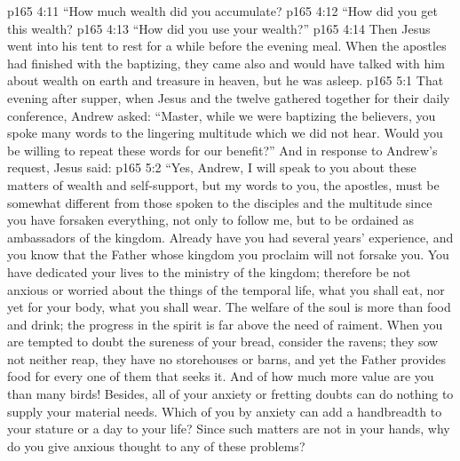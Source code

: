 \vs p165 4:11 \textcolor{ubdarkred}{“\bibnobreakspace How much wealth did you accumulate?}
\vs p165 4:12 \textcolor{ubdarkred}{“\bibnobreakspace How did you get this wealth?}
\vs p165 4:13 \textcolor{ubdarkred}{“\bibnobreakspace How did you use your wealth?”}
\vs p165 4:14 \pc Then Jesus went into his tent to rest for a while before the evening meal. When the apostles had finished with the baptizing, they came also and would have talked with him about wealth on earth and treasure in heaven, but he was asleep.
\vs p165 5:1 That evening after supper, when Jesus and the twelve gathered together for their daily conference, Andrew asked: “Master, while we were baptizing the believers, you spoke many words to the lingering multitude which we did not hear. Would you be willing to repeat these words for our benefit?” And in response to Andrew’s request, Jesus said:
\vs p165 5:2 \pc \textcolor{ubdarkred}{“Yes, Andrew, I will speak to you about these matters of wealth and self\hyp{}support, but my words to you, the apostles, must be somewhat different from those spoken to the disciples and the multitude since you have forsaken everything, not only to follow me, but to be ordained as ambassadors of the kingdom. Already have you had several years’ experience, and you know that the Father whose kingdom you proclaim will not forsake you. You have dedicated your lives to the ministry of the kingdom; therefore be not anxious or worried about the things of the temporal life, what you shall eat, nor yet for your body, what you shall wear. The welfare of the soul is more than food and drink; the progress in the spirit is far above the need of raiment. When you are tempted to doubt the sureness of your bread, consider the ravens; they sow not neither reap, they have no storehouses or barns, and yet the Father provides food for every one of them that seeks it. And of how much more value are you than many birds! Besides, all of your anxiety or fretting doubts can do nothing to supply your material needs. Which of you by anxiety can add a handbreadth to your stature or a day to your life? Since such matters are not in your hands, why do you give anxious thought to any of these problems?}
